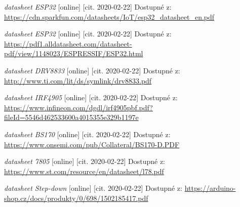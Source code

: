 \documentclass{template/socthesis}
\begin{document}
\begin{thebibliography}{1}
			\textit{datasheet ESP32} [online] [cit. 2020-02-22] Dostupné z:
			\url{https://cdn.sparkfun.com/datasheets/IoT/esp32_datasheet_en.pdf}
			
			\textit{datasheet ESP32} [online] [cit. 2020-02-22] Dostupné z:
			\url{https://pdf1.alldatasheet.com/datasheet-pdf/view/1148023/ESPRESSIF/ESP32.html}
			
			
			\textit{datasheet DRV8833} [online] [cit. 2020-02-22] Dostupné z:
			\url{http://www.ti.com/lit/ds/symlink/drv8833.pdf}
			
			
			\textit{datasheet IRF4905} [online] [cit. 2020-02-22] Dostupné z:
			\url{https://www.infineon.com/dgdl/irf4905pbf.pdf?fileId=5546d462533600a4015355e329b1197e}
			
			
			\textit{datasheet BS170} [online] [cit. 2020-02-22] Dostupné z:
			\url{https://www.onsemi.com/pub/Collateral/BS170-D.PDF}
			
			
			\textit{datasheet 7805} [online] [cit. 2020-02-22] Dostupné z:
			\url{https://www.st.com/resource/en/datasheet/l78.pdf}
			
			
			\textit{datasheet Step-down} [online] [cit. 2020-02-22] Dostupné z:
			\url{https://arduino-shop.cz/docs/produkty/0/698/1502185417.pdf}
			

\end{thebibliography}
\end{document}
